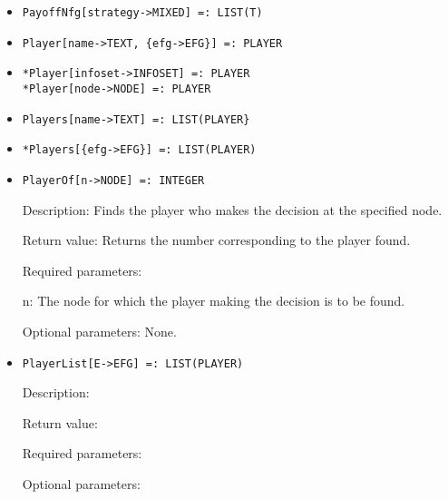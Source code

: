 \begin{itemize}
\item
\protect \large \begin{verbatim}
PayoffNfg[strategy->MIXED] =: LIST(T)
\end{verbatim}\normalsize

\item
\protect \large \begin{verbatim} 
Player[name->TEXT, {efg->EFG}] =: PLAYER
\end{verbatim}\normalsize

\item
\protect \large \begin{verbatim}
*Player[infoset->INFOSET] =: PLAYER
*Player[node->NODE] =: PLAYER
\end{verbatim}\normalsize

\item
\protect \large \begin{verbatim} 
Players[name->TEXT] =: LIST(PLAYER}
\end{verbatim}\normalsize

\item
\protect \large \begin{verbatim}
*Players[{efg->EFG}] =: LIST(PLAYER)
\end{verbatim} \normalsize

\item
\protect \large \begin{verbatim}
PlayerOf[n->NODE] =: INTEGER
\end{verbatim}\normalsize

\bd
\item
[Description:] Finds the player who makes the decision at the
specified node.
\item
[Return value:] Returns the number corresponding to the player found.
\item
[Required parameters:]\hfil\null

\bd
\item
[n:] The node for which the player making the decision is to be found.
\ed

\item
[Optional parameters:] None.
\ed

\item
\protect \large \begin{verbatim}
PlayerList[E->EFG] =: LIST(PLAYER)
\end{verbatim} \normalsize

\bd
\item
[Description:]
\item
[Return value:]
\item
[Required parameters:]
\item
[Optional parameters:]
\ed


\end{itemize}
